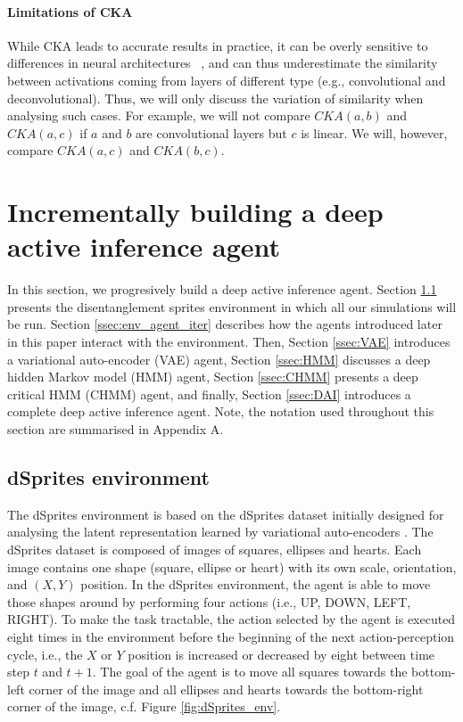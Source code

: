 \documentclass[twoside,11pt]{article}
\begin{document}
\paragraph{Limitations of CKA}
While CKA leads to accurate results in practice, it can be overly sensitive to differences in neural architectures ~\citet{Maheswaranathan2019}, and can thus underestimate the similarity between activations coming from layers of different type (e.g., convolutional and deconvolutional). Thus, we will only discuss the variation of similarity when analysing such cases.
For example, we will not compare $CKA(a, b)$ and $CKA(a, c)$ if $a$ and $b$ are convolutional layers but
$c$ is linear. We will, however, compare $CKA(a, c)$ and $CKA(b, c)$.

\section{Incrementally building a deep active inference agent} \label{sec:build_dai}

In this section, we progresively build a deep active inference agent. Section \ref{ssec:dSprites_env} presents the disentanglement sprites environment in which all our simulations will be run. Section \ref{ssec:env_agent_iter} describes how the agents introduced later in this paper interact with the environment. Then, Section \ref{ssec:VAE} introduces a variational auto-encoder (VAE) agent, Section \ref{ssec:HMM} discusses a deep hidden Markov model (HMM) agent, Section \ref{ssec:CHMM} presents a deep critical HMM (CHMM) agent, and finally, Section \ref{ssec:DAI} introduces a complete deep active inference agent. Note, the notation used throughout this section are summarised in Appendix A.

\subsection{dSprites environment} \label{ssec:dSprites_env}

The dSprites environment is based on the dSprites dataset \citep{dsprites17} initially designed for analysing the latent representation learned by variational auto-encoders \citep{VAE}. The dSprites dataset is composed of images of squares, ellipses and hearts. Each image contains one shape (square, ellipse or heart) with its own scale, orientation, and $(X,Y)$ position. In the dSprites environment, the agent is able to move those shapes around by performing four actions (i.e., UP, DOWN, LEFT, RIGHT). To make the task tractable, the action selected by the agent is executed eight times in the environment before the beginning of the next action-perception cycle, i.e., the $X$ or $Y$ position is increased or decreased by eight between time step $t$ and $t+1$. The goal of the agent is to move all squares towards the bottom-left corner of the image and all ellipses and hearts towards the bottom-right corner of the image, c.f. Figure \ref{fig:dSprites_env}.
\end{document}
